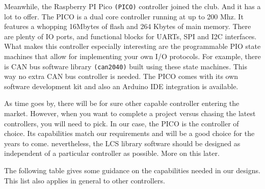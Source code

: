 Meanwhile, the Raspberry PI Pico \texttt{(PICO)} controller joined the club. And it has a lot to offer. The PICO is a dual core controller running at up to 200 Mhz. It features a whopping 16Mbytes of flash and 264 Kbytes of main memory. There are plenty of IO ports, and functional blocks for UARTs, SPI and I2C interfaces. What makes this controller especially interesting are the programmable PIO state machines that allow for implementing your own I/O protocols. For example, there is CAN bus software library \texttt{(can2040)} built using these state machines. This way no extra CAN bus controller is needed. The PICO comes with its own software development kit and also an Arduino IDE integration is available.

As time goes by, there will be for sure other capable controller entering the market. However, when you want to complete a project versus chasing the latest controllers, you will need to pick. In our case, the PICO is the controller of choice. Its capabilities match our requirements and will be a good choice for the years to come. nevertheless, the LCS library software should be designed as independent of a particular controller as possible. More on this later. 


 The following table gives some guidance on the capabilities needed in our designs. This list also applies in general to other controllers.

